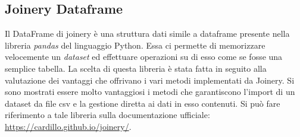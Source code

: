 \subsection{Joinery Dataframe}
Il DataFrame di joinery è una struttura dati simile a dataframe presente nella libreria \emph{pandas} del linguaggio Python.
Essa ci permette di memorizzare velocemente un \emph{dataset} ed effettuare operazioni su di esso come se fosse una semplice tabella.
La scelta di questa libreria è stata fatta in seguito alla valutazione dei vantaggi che offrivano i vari metodi implementati da Joinery.
Si sono mostrati essere molto vantaggiosi i metodi che garantiscono l'import di un dataset da file csv e la gestione diretta ai dati in esso contenuti.
Si può fare riferimento a tale libreria sulla documentazione ufficiale: \url{https://cardillo.github.io/joinery/}.
